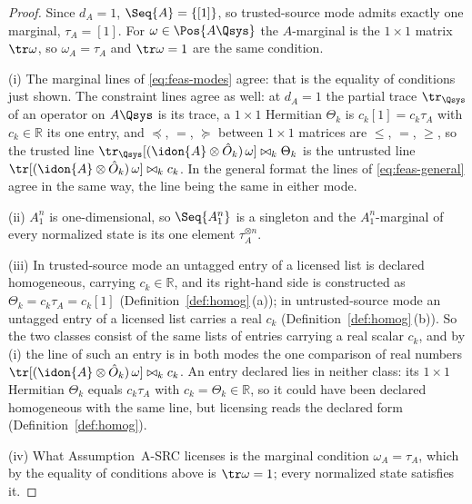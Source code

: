 \begin{proof}
Since $d_A=1$, $\Seq{A}=\{[1]\}$, so trusted-source mode admits exactly one
marginal, $\tau_A=[1]$. For $\omega\in\Pos{A\Qsys}$ the $A$-marginal is the
$1\times1$ matrix $\tr\omega$, so $\omega_A=\tau_A$ and $\tr\omega=1$ are
the same condition.

(i) The marginal lines of \eqref{eq:feas-modes} agree: that is the
equality of conditions just shown. The constraint lines agree as well: at
$d_A=1$ the partial trace $\tr_{\Qsys}$ of an operator on $A\Qsys$ is its
trace, a $1\times1$ Hermitian $\Theta_k$ is $c_k[1]=c_k\tau_A$ with
$c_k\in\mathbb{R}$ its one entry, and $\preceq$, $=$, $\succeq$ between
$1\times1$ matrices are $\le$, $=$, $\ge$, so the trusted line
$\tr_{\Qsys}[(\idon{A}\otimes\hat O_k)\,\omega]\bowtie_k\Theta_k$ is the
untrusted line $\tr[(\idon{A}\otimes\hat O_k)\,\omega]\bowtie_kc_k$. In
the general format the lines of \eqref{eq:feas-general} agree in the same
way, the  line being the same in either mode.

(ii) $A_1^n$ is one-dimensional, so $\Seq{A_1^n}$ is a singleton and the
$A_1^n$-marginal of every normalized state is its one element
$\tau_A^{\otimes n}$.

(iii) In trusted-source mode an untagged entry of a licensed list is
declared homogeneous, carrying $c_k\in\mathbb{R}$, and its right-hand side
is constructed as $\Theta_k=c_k\tau_A=c_k[1]$
(Definition~\ref{def:homog}\,(a)); in untrusted-source mode an untagged
entry of a licensed list carries a real $c_k$
(Definition~\ref{def:homog}\,(b)). So the two classes consist of the same
lists of entries carrying a real scalar $c_k$, and by (i) the line of such
an entry is in both modes the one comparison of real numbers
$\tr[(\idon{A}\otimes\hat O_k)\,\omega]\bowtie_kc_k$. An entry declared
 lies in neither class: its $1\times1$ Hermitian
$\Theta_k$ equals $c_k\tau_A$ with $c_k=\Theta_k\in\mathbb{R}$, so it
could have been declared homogeneous with the same line, but licensing
reads the declared form (Definition~\ref{def:homog}).

(iv) What Assumption~A-SRC licenses is the marginal condition
$\omega_A=\tau_A$, which by the equality of conditions above is
$\tr\omega=1$; every normalized state satisfies it.
\end{proof}
